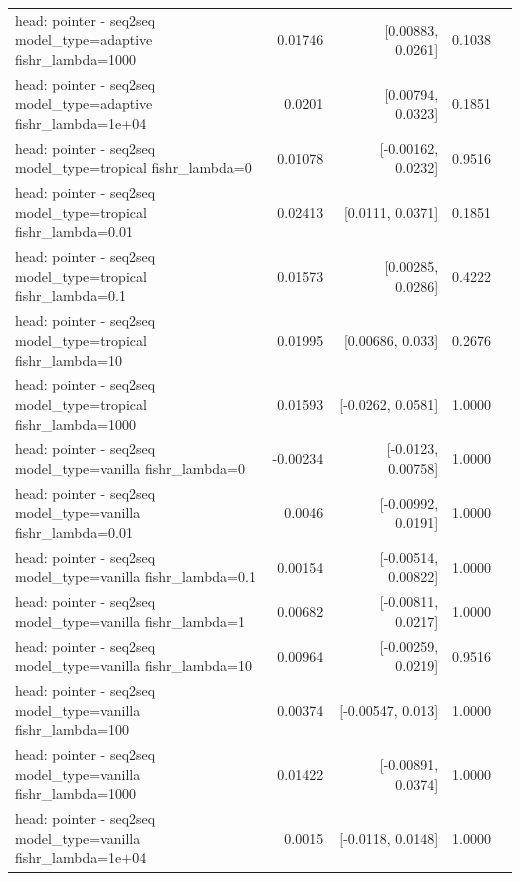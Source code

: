 \documentclass[10pt]{article}
\makeatletter
\newcommand{\stackcell}[1]{\begin{tabular}[t]{@{}l@{}}#1\end{tabular}}
\makeatother
\begin{document}
{\begin{longtable}{lrrrl}
\stackcell{head: pointer - seq2seq\\\footnotesize model\_type=adaptive fishr\_lambda=1000 } & 0.01746 & [0.00883, 0.0261] & 0.1038 & \\
\stackcell{head: pointer - seq2seq\\\footnotesize model\_type=adaptive fishr\_lambda=1e+04 } & 0.0201 & [0.00794, 0.0323] & 0.1851 & \\
\stackcell{head: pointer - seq2seq\\\footnotesize model\_type=tropical fishr\_lambda=0 } & 0.01078 & [-0.00162, 0.0232] & 0.9516 & \\
\stackcell{head: pointer - seq2seq\\\footnotesize model\_type=tropical fishr\_lambda=0.01 } & 0.02413 & [0.0111, 0.0371] & 0.1851 & \\
\stackcell{head: pointer - seq2seq\\\footnotesize model\_type=tropical fishr\_lambda=0.1 } & 0.01573 & [0.00285, 0.0286] & 0.4222 & \\
\stackcell{head: pointer - seq2seq\\\footnotesize model\_type=tropical fishr\_lambda=10 } & 0.01995 & [0.00686, 0.033] & 0.2676 & \\
\stackcell{head: pointer - seq2seq\\\footnotesize model\_type=tropical fishr\_lambda=1000 } & 0.01593 & [-0.0262, 0.0581] & 1.0000 & \\
\stackcell{head: pointer - seq2seq\\\footnotesize model\_type=vanilla fishr\_lambda=0 } & -0.00234 & [-0.0123, 0.00758] & 1.0000 & \\
\stackcell{head: pointer - seq2seq\\\footnotesize model\_type=vanilla fishr\_lambda=0.01 } & 0.0046 & [-0.00992, 0.0191] & 1.0000 & \\
\stackcell{head: pointer - seq2seq\\\footnotesize model\_type=vanilla fishr\_lambda=0.1 } & 0.00154 & [-0.00514, 0.00822] & 1.0000 & \\
\stackcell{head: pointer - seq2seq\\\footnotesize model\_type=vanilla fishr\_lambda=1 } & 0.00682 & [-0.00811, 0.0217] & 1.0000 & \\
\stackcell{head: pointer - seq2seq\\\footnotesize model\_type=vanilla fishr\_lambda=10 } & 0.00964 & [-0.00259, 0.0219] & 0.9516 & \\
\stackcell{head: pointer - seq2seq\\\footnotesize model\_type=vanilla fishr\_lambda=100 } & 0.00374 & [-0.00547, 0.013] & 1.0000 & \\
\stackcell{head: pointer - seq2seq\\\footnotesize model\_type=vanilla fishr\_lambda=1000 } & 0.01422 & [-0.00891, 0.0374] & 1.0000 & \\
\stackcell{head: pointer - seq2seq\\\footnotesize model\_type=vanilla fishr\_lambda=1e+04 } & 0.0015 & [-0.0118, 0.0148] & 1.0000 & \\
\bottomrule
\end{longtable}
}
\end{document}
